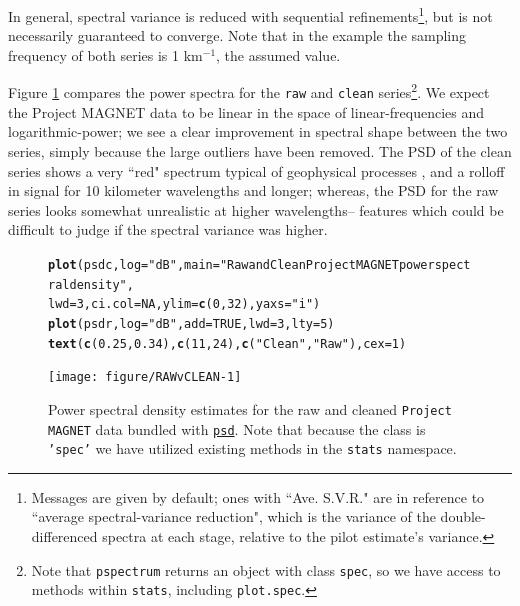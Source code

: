 \documentclass[10pt]{article}\usepackage[]{graphicx}\usepackage[]{color}
\makeatletter
\newcommand{\hlnum}[1]{\textcolor[rgb]{0.686,0.059,0.569}{#1}}%
\newcommand{\hlstr}[1]{\textcolor[rgb]{0.192,0.494,0.8}{#1}}%
\newcommand{\hlstd}[1]{\textcolor[rgb]{0.345,0.345,0.345}{#1}}%
\newcommand{\hlkwc}[1]{\textcolor[rgb]{0.333,0.667,0.333}{#1}}%
\newcommand{\hlkwd}[1]{\textcolor[rgb]{0.737,0.353,0.396}{\textbf{#1}}}%
\newenvironment{kframe}{%
 \def\at@end@of@kframe{}%
 \ifinner\ifhmode%
  \def\at@end@of@kframe{\end{minipage}}%
  \begin{minipage}{\columnwidth}%
 \fi\fi%
 \def\FrameCommand##1{\hskip\@totalleftmargin \hskip-\fboxsep
 \colorbox{shadecolor}{##1}\hskip-\fboxsep
     \hskip-\linewidth \hskip-\@totalleftmargin \hskip\columnwidth}%
 \MakeFramed {\advance\hsize-\width
   \@totalleftmargin\z@ \linewidth\hsize
   \@setminipage}}%
 {\par\unskip\endMakeFramed%
 \at@end@of@kframe}
\newenvironment{knitrout}{}{} %
\newcommand{\Rcmd}[1]{\texttt{#1}}
\newcommand{\psd}[0]{\href{http://www.github.com/abarbour/psd/}{\color{blue}\Rcmd{psd}}}
\makeatother
\begin{document}
In general, spectral variance is reduced
with sequential refinements\footnote{
Messages are given by default; ones with
``Ave. S.V.R."
are in reference to 
 ``average spectral-variance reduction", which
 is the variance of the
 double-differenced spectra at each stage, relative
 to the pilot estimate's variance.
}, but is not necessarily guaranteed to converge.
Note that in the example
the sampling frequency of both series
is 1 km$^{-1}$, the assumed value.

Figure \ref{fig:pmag} compares the 
power spectra for the \Rcmd{raw} and \Rcmd{clean} 
series\footnote{
Note that \Rcmd{pspectrum} returns
an object with class \Rcmd{spec}, so we have access to methods 
within \Rcmd{stats}, including \Rcmd{plot.spec}.
}.  
We expect the Project MAGNET data to be linear in the space of
linear-frequencies and logarithmic-power;
we see a clear
improvement in spectral shape between the two series,
simply because the large outliers have been removed.
The PSD of the clean series shows a
very ``red" spectrum typical of geophysical processes \citep{agnew1992},
and a rolloff in signal
for 10 kilometer wavelengths and longer; whereas, the 
PSD for the raw series looks somewhat unrealistic at higher wavelengths--
features which could be difficult to judge if the spectral variance was higher.

\begin{figure}[h!]
\begin{center}
\begin{knitrout}\small
{}\color{fgcolor}\begin{kframe}
\begin{alltt}
\hlkwd{plot}\hlstd{(psdc,} \hlkwc{log} \hlstd{=} \hlstr{"dB"}\hlstd{,} \hlkwc{main} \hlstd{=} \hlstr{"Raw and Clean Project MAGNET power spectral density"}\hlstd{,}
    \hlkwc{lwd} \hlstd{=} \hlnum{3}\hlstd{,} \hlkwc{ci.col} \hlstd{=} \hlnum{NA}\hlstd{,} \hlkwc{ylim} \hlstd{=} \hlkwd{c}\hlstd{(}\hlnum{0}\hlstd{,} \hlnum{32}\hlstd{),} \hlkwc{yaxs} \hlstd{=} \hlstr{"i"}\hlstd{)}
\hlkwd{plot}\hlstd{(psdr,} \hlkwc{log} \hlstd{=} \hlstr{"dB"}\hlstd{,} \hlkwc{add} \hlstd{=} \hlnum{TRUE}\hlstd{,} \hlkwc{lwd} \hlstd{=} \hlnum{3}\hlstd{,} \hlkwc{lty} \hlstd{=} \hlnum{5}\hlstd{)}
\hlkwd{text}\hlstd{(}\hlkwd{c}\hlstd{(}\hlnum{0.25}\hlstd{,} \hlnum{0.34}\hlstd{),} \hlkwd{c}\hlstd{(}\hlnum{11}\hlstd{,} \hlnum{24}\hlstd{),} \hlkwd{c}\hlstd{(}\hlstr{"Clean"}\hlstd{,} \hlstr{"Raw"}\hlstd{),} \hlkwc{cex} \hlstd{=} \hlnum{1}\hlstd{)}
\end{alltt}
\end{kframe}
\texttt{[image: figure/RAWvCLEAN-1]} 

\end{knitrout}
\caption{Power spectral density estimates for the raw and cleaned
             \Rcmd{Project MAGNET} data bundled with \psd{}. Note that
             because the class is \Rcmd{'spec'} we have
             utilized  existing methods in the \Rcmd{stats} namespace.}
\label{fig:pmag}
\end{center}
\end{figure}
\end{document}
